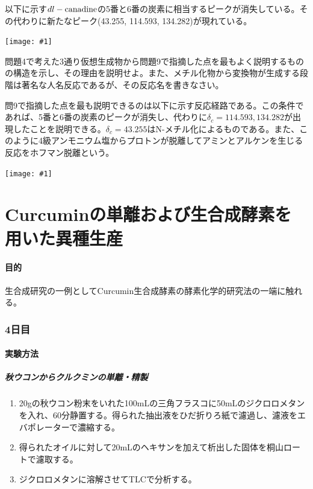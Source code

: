 \documentclass[a4paper,papersize,dvipdfmx]{jsarticle}
\newcommand{\pict}[2]{\begin{center} \texttt{[image: \#1]} \end{center}}   %
\begin{document}
以下に示す$dl-\rm canadine$の5番と6番の炭素に相当するピークが消失している。その代わりに新たなピーク(43.255, 114.593, 134.282)が現れている。

\pict{imgs/kd09.jpeg}{5}

\begin{tcolorbox}[colback=white,colbacktitle=black,coltitle=white,title={問題10}]
問題4で考えた3通り仮想生成物から問題9で指摘した点を最もよく説明するものの構造を示し、その理由を説明せよ。また、メチル化物から変換物が生成する段階は著名な人名反応であるが、その反応名を書きなさい。
\end{tcolorbox}

問9で指摘した点を最も説明できるのは以下に示す反応経路である。この条件であれば、5番と6番の炭素のピークが消失し、代わりに$\delta _c =  114.593, 134.282$が出現したことを説明できる。$\delta _c = 43.255$はN-メチル化によるものである。また、このように4級アンモニウム塩からプロトンが脱離してアミンとアルケンを生じる反応をホフマン脱離という。

\pict{imgs/kd10.jpeg}{10}

\newpage

\part{Curcuminの単離および生合成酵素を用いた異種生産}

\subsection*{目的}
生合成研究の一例としてCurcumin生合成酵素の酵素化学的研究法の一端に触れる。
\section*{4日目}
\subsection*{実験方法}
\subsubsection*{秋ウコンからクルクミンの単離・精製}
\begin{enumerate}
\item 20gの秋ウコン粉末をいれた100mLの三角フラスコに50mLのジクロロメタンを入れ、60分静置する。得られた抽出液をひだ折りろ紙で濾過し、濾液をエバポレーターで濃縮する。
\item 得られたオイルに対して20mLのヘキサンを加えて析出した固体を桐山ロートで濾取する。
\item ジクロロメタンに溶解させてTLCで分析する。

\end{enumerate}
\end{document}
